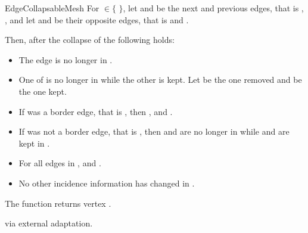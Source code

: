 \begin{ccRefConcept}{EdgeCollapsableMesh}
For  $\in \{$  $\}$, let  and  be the next and previous 
edges, that is , , and let 
 and  be their opposite edges, that is 
 and .

Then, after the collapse of  the following holds:

\begin{itemize}
\item The edge  is no longer in .
\item One of  is no longer in  while the other is kept. Let  be the one removed and  be the one kept.
\item If  was a border edge, that is , then , and .
\item If  was not a border edge, that is , then  and  are no longer in  while  and  are kept in .
\item For all edges  in ,  and .
\item No other incidence information has changed in .
\end{itemize}

The function returns vertex . 


\ccHasModels
{} via external adaptation.

\ccSeeAlso
{}\\

\end{ccRefConcept}

